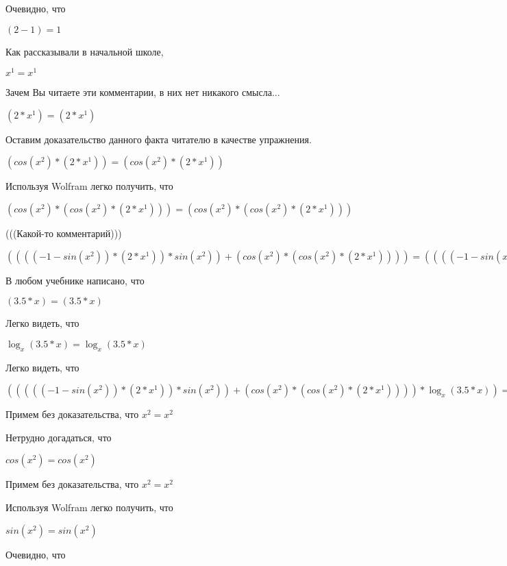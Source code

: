 \documentclass[12pt,a4paper,fleqn]{article}
\theoremstyle{definition}
\begin{document}
Очевидно, что

$( 2  -  1 ) =  1 $

Как рассказывали в начальной школе,

${ x }^{ 1 } = { x }^{ 1 }$

Зачем Вы читаете эти комментарии, в них нет никакого смысла...

$( 2  * { x }^{ 1 }) = ( 2  * { x }^{ 1 })$

Оставим доказательство данного факта читателю в качестве упражнения.

$(cos({ x }^{ 2 }) * ( 2  * { x }^{ 1 })) = (cos({ x }^{ 2 }) * ( 2  * { x }^{ 1 }))$

Используя Wolfram легко получить, что

$(cos({ x }^{ 2 }) * (cos({ x }^{ 2 }) * ( 2  * { x }^{ 1 }))) = (cos({ x }^{ 2 }) * (cos({ x }^{ 2 }) * ( 2  * { x }^{ 1 })))$

(((Какой-то комментарий)))

$(((( -1  - sin({ x }^{ 2 })) * ( 2  * { x }^{ 1 })) * sin({ x }^{ 2 })) + (cos({ x }^{ 2 }) * (cos({ x }^{ 2 }) * ( 2  * { x }^{ 1 })))) = (((( -1  - sin({ x }^{ 2 })) * ( 2  * { x }^{ 1 })) * sin({ x }^{ 2 })) + (cos({ x }^{ 2 }) * (cos({ x }^{ 2 }) * ( 2  * { x }^{ 1 }))))$

В любом учебнике написано, что

$( 3.5  *  x ) = ( 3.5  *  x )$

Легко видеть, что

$\log_{ x }{( 3.5  *  x )} = \log_{ x }{( 3.5  *  x )}$

Легко видеть, что

$((((( -1  - sin({ x }^{ 2 })) * ( 2  * { x }^{ 1 })) * sin({ x }^{ 2 })) + (cos({ x }^{ 2 }) * (cos({ x }^{ 2 }) * ( 2  * { x }^{ 1 })))) * \log_{ x }{( 3.5  *  x )}) = ((((( -1  - sin({ x }^{ 2 })) * ( 2  * { x }^{ 1 })) * sin({ x }^{ 2 })) + (cos({ x }^{ 2 }) * (cos({ x }^{ 2 }) * ( 2  * { x }^{ 1 })))) * \log_{ x }{( 3.5  *  x )})$

Примем без доказательства, что
${ x }^{ 2 } = { x }^{ 2 }$

Нетрудно догадаться, что

$cos({ x }^{ 2 }) = cos({ x }^{ 2 })$

Примем без доказательства, что
${ x }^{ 2 } = { x }^{ 2 }$

Используя Wolfram легко получить, что

$sin({ x }^{ 2 }) = sin({ x }^{ 2 })$

Очевидно, что
\end{document}
